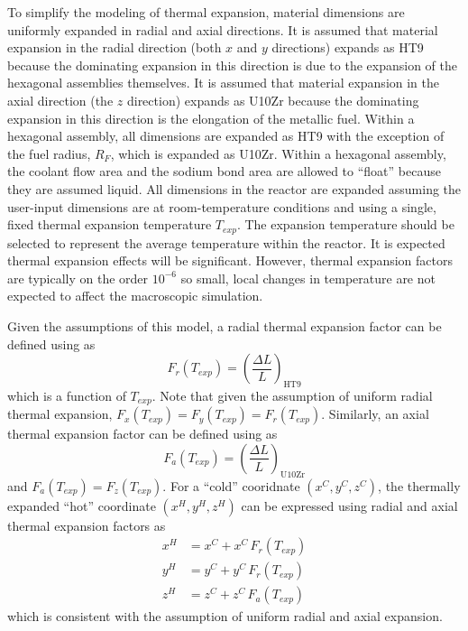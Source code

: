   To simplify the modeling of thermal expansion, material dimensions are
  uniformly expanded in radial and axial directions. It is assumed that material
  expansion in the radial direction (both $x$ and $y$ directions) expands
  as HT9 because the dominating expansion in this direction is
  due to the expansion of the hexagonal assemblies themselves. It is assumed 
  that material expansion in the axial direction (the $z$ direction) expands
  as U10Zr because the dominating expansion in this direction is the elongation
  of the metallic fuel. Within a hexagonal assembly, all dimensions are expanded
  as HT9 with the exception of the fuel radius, $R_F$, which is expanded as 
  U10Zr. Within a hexagonal assembly, the coolant flow area and the sodium bond
  area are allowed to ``float'' because they are assumed liquid. All dimensions
  in the reactor are expanded assuming the user-input dimensions are at
  room-temperature conditions and using a single, fixed thermal expansion
  temperature $T_{exp}$. The expansion temperature should be selected to
  represent the average temperature within the reactor. It is expected thermal
  expansion effects will be significant. However, thermal expansion factors are
  typically on the order $10^{-6}$ so small, local changes in temperature are
  not expected to affect the macroscopic simulation.

  Given the assumptions of this model, a radial thermal expansion factor can be
  defined using  as
  \begin{equation}
    \label{eq:lef_r}
    F_r(T_{exp}) = \left(\frac{\Delta L}{L}\right)_{\text{HT9}}
  \end{equation}
  which is a function of $T_{exp}$. Note that given the assumption of uniform
  radial thermal expansion, ${F_x(T_{exp}) = F_y(T_{exp}) = F_r(T_{exp})}$.
  Similarly, an axial thermal expansion factor can be defined using
   as 
  \begin{equation}
    \label{eq:lef_a}
    F_a(T_{exp}) = \left(\frac{\Delta L}{L}\right)_{\text{U10Zr}}
  \end{equation}
  and $F_a(T_{exp}) = F_z(T_{exp})$. For a ``cold'' cooridnate $(x^C,y^C,z^C)$,
  the thermally expanded ``hot'' coordinate $(x^H,y^H,z^H)$ can be expressed 
  using radial and axial thermal expansion factors as
  \begin{align}
    \label{eq:expand_x}
    x^H &= x^C + x^C \, F_r(T_{exp}) \\
    \label{eq:expand_y}
    y^H &= y^C + y^C \, F_r(T_{exp}) \\
    \label{eq:expand_z}
    z^H &= z^C + z^C \, F_a(T_{exp})
  \end{align}
  which is consistent with the assumption of uniform radial and axial expansion.


